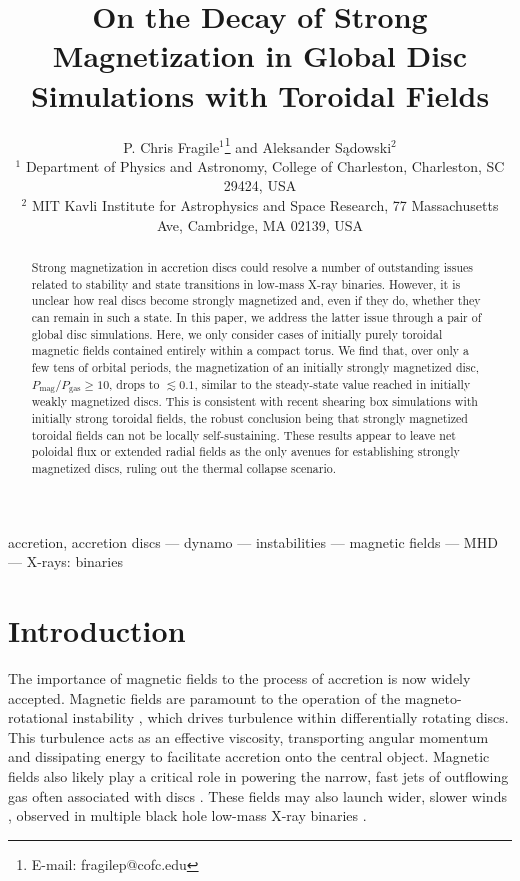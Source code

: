 \documentclass[useAMS,usenatbib]{mn2e}
\title[Decay of Strong Magnetization]{On the Decay of Strong Magnetization in Global Disc Simulations with Toroidal Fields}
\author[P. C. Fragile \& A. S\k{a}dowski]
       {P. Chris Fragile$^1$\thanks{E-mail: fragilep@cofc.edu}
       and
	Aleksander S\k{a}dowski$^2$\\
        $^1$ Department of Physics and Astronomy, College of Charleston, Charleston, SC 29424, USA\\
        $^2$ MIT Kavli Institute for Astrophysics and Space Research, 77 Massachusetts Ave, Cambridge, MA 02139, USA
}
\def\pmpg{P_\mathrm{mag}/P_\mathrm{gas}}
\begin{document}
\maketitle

\label{firstpage}

\begin{abstract}
Strong magnetization in accretion discs could resolve a number of outstanding issues related to stability and state transitions in low-mass X-ray binaries.  However, it is unclear how real discs become strongly magnetized and, even if they do, whether they can remain in such a state.  In this paper, we address the latter issue through a pair of global disc simulations.  Here, we only consider cases of initially purely toroidal magnetic fields contained entirely within a compact torus.  We find that, over only a few tens of orbital periods, the magnetization of an initially strongly magnetized disc, $\pmpg \ge 10$, drops to $\lesssim 0.1$, similar to the steady-state value reached in initially weakly magnetized discs.  This is consistent with recent shearing box simulations with initially strong toroidal fields, the robust conclusion being that strongly magnetized toroidal fields can not be locally self-sustaining. These results appear to leave net poloidal flux or extended radial fields as the only avenues for establishing strongly magnetized discs, ruling out the thermal collapse scenario.
\end{abstract}

\begin{keywords}
accretion, accretion discs --- dynamo --- instabilities --- magnetic fields --- MHD --- X-rays: binaries
\end{keywords}


\section{Introduction}
\label{s.introduction}

The importance of magnetic fields to the process of accretion is now widely accepted.  Magnetic fields are paramount to the operation of the magneto-rotational instability \citep[MRI;][]{Balbus91}, which drives turbulence within differentially rotating discs.  This turbulence acts as an effective viscosity, transporting angular momentum and dissipating energy to facilitate accretion onto the central object.  Magnetic fields also likely play a critical role in powering the narrow, fast jets of outflowing gas often associated with discs \citep{Blandford77}.  These fields may also launch wider, slower winds \citep{Blandford82}, observed in multiple black hole low-mass X-ray binaries \citep[LMXBs;][]{Miller06,Ponti12}.
\end{document}
